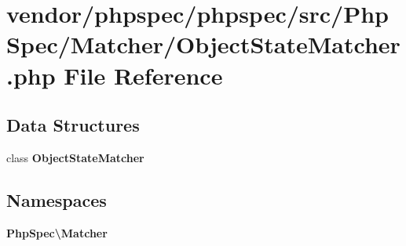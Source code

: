 \section{vendor/phpspec/phpspec/src/\+Php\+Spec/\+Matcher/\+Object\+State\+Matcher.php File Reference}
\label{_object_state_matcher_8php}
\subsection*{Data Structures}
\begin{DoxyCompactItemize}
\item 
class {\bf Object\+State\+Matcher}
\end{DoxyCompactItemize}
\subsection*{Namespaces}
\begin{DoxyCompactItemize}
\item 
 {\bf Php\+Spec\textbackslash{}\+Matcher}
\end{DoxyCompactItemize}
